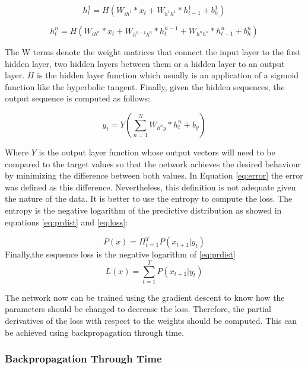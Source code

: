 \begin{equation} \label{eq:hidden1}
h_t^1= H( W_{ih^1} * x_t + W_{h^1 h^1}*h^1_{t-1} + b^1_h)
\end{equation}

\begin{equation} \label{eq:hidden}
h_t^n= H(W_{ih^n} * x_t + W_{h^{n-1}  h^n} * h^{n-1}_t +W_{h^n h^n} * h^n_{t-1}+ b^n_h)
\end{equation}

The W terms denote the weight matrices that connect the input layer to the first hidden layer, two hidden layers between them or a hidden layer to an output layer. $H$ is the hidden layer function which usually is an application of a sigmoid function like the hyperbolic tangent. Finally, given the hidden sequences, the output sequence is computed as follows:

\begin{equation} \label{eq:output}
y_t=Y(\sum_{n=1}^{N} W_{h^{n}y} * h^n_t + b_y)
\end{equation}

Where $Y$ is the output layer function whose output vectors will need to be compared to the target values so that the network achieves the desired behaviour by minimizing the difference between both values. In Equation \ref{eq:error} the error was defined as this difference. Nevertheless, this definition is not adequate given the nature of the data. It is better to use the entropy to compute the loss. The entropy is the negative logarithm of the predictive distribution as showed in equations \ref{eq:prdist} and \ref{eq:loss}:

\begin{equation} \label{eq:prdist}
P(x)=\Pi_{t=1}^{T} P(x_{t+1}|y_t)
\end{equation}
Finally,the sequence loss is the negative logarithm of \ref{eq:prdist}
\begin{equation} \label{eq:loss}
L(x)=\sum_{t=1}^{T} P(x_{t+1}|y_t)
\end{equation}

The network now can be trained using the gradient descent to know how the parameters should be changed to decrease the loss. Therefore, the partial derivatives of the loss with respect to the weights should be computed. This can be achieved using backpropagation through time.


\subsubsection{Backpropagation Through Time}

